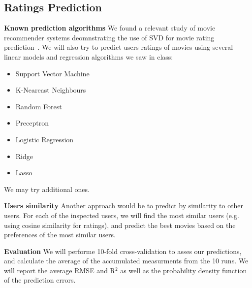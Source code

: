 \subsection{Ratings Prediction}
\textbf{Known prediction algorithms}
We found a relevant study of movie recommender systems deomnstrating the use of SVD for movie rating prediction~\cite{Ekstrand:2011:RRR:2043932.2043958}.
We will also try to predict users ratings of movies using several linear models and regression algorithms we saw in class:
\begin{itemize}
\item Support Vector Machine
\item K-Neareast Neighbours
\item Random Forest
\item Preceptron
\item Logistic Regression
\item Ridge
\item Lasso
\end{itemize}
We may try additional ones.

\textbf{Users similarity}
Another approach would be to predict by similarity to other users. For each of the inspected users, we will find the most similar users (e.g. using cosine similarity for ratings), and predict the best movies based on the preferences of the most similar users.

\textbf{Evaluation}
We will performe 10-fold cross-validation to asses our predictions, and calculate the average of the accumulated measurments from the 10 runs. We will report the average RMSE and R$^2$ as well as the probability density function of the prediction errors.

